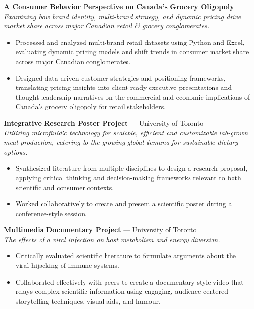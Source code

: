 \documentclass[10pt]{article}
\begin{document}
\textbf{A Consumer Behavior Perspective on Canada's Grocery Oligopoly}\\
{\small\itshape Examining how brand identity, multi-brand strategy, and dynamic pricing drive market share across major Canadian retail \& grocery conglomerates.}
\begin{itemize}
  \item Processed and analyzed multi-brand retail datasets using Python and Excel, evaluating dynamic pricing models and shift trends in consumer market share across major Canadian conglomerates.
  \item Designed data-driven customer strategies and positioning frameworks, translating pricing insights into client-ready executive presentations and thought leadership narratives on the commercial and economic implications of Canada's grocery oligopoly for retail stakeholders.
\end{itemize}

\vspace{2pt}
\textbf{Integrative Research Poster Project} --- University of Toronto\\
{\small\itshape Utilizing microfluidic technology for scalable, efficient and customizable lab-grown meat production, catering to the growing global demand for sustainable dietary options.}
\begin{itemize}
  \item Synthesized literature from multiple disciplines to design a research proposal, applying critical thinking and decision-making frameworks relevant to both scientific and consumer contexts.
  \item Worked collaboratively to create and present a scientific poster during a conference-style session.
\end{itemize}

\vspace{2pt}
\textbf{Multimedia Documentary Project} --- University of Toronto\\
{\small\itshape The effects of a viral infection on host metabolism and energy diversion.}
\begin{itemize}
  \item Critically evaluated scientific literature to formulate arguments about the viral hijacking of immune systems.
  \item Collaborated effectively with peers to create a documentary-style video that relays complex scientific information using engaging, audience-centered storytelling techniques, visual aids, and humour.
\end{itemize}
\end{document}

